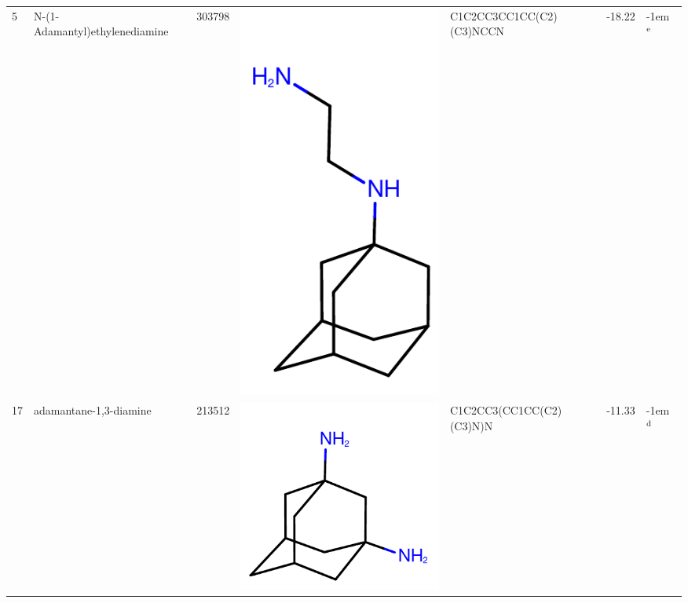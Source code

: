 \documentclass[aps,pre,twocolumn,nofootinbib,superscriptaddress,10pt, final,tightenlines]{revtex4-1}
\begin{document}
\begin{table}
\begin{tabular}{lllp{1.5cm}>{\ttfamily}lS[table-format=-1.2, table-figures-uncertainty=1]l}
5  & N-(1-Adamantyl)ethylenediamine     & 303798    & \parbox[c]{1em}{\includegraphics[scale=0.2]{figures/303798.pdf}}    & C1C2CC3CC1CC(C2)(C3)NCCN                     & -18.22  & \kern-1em {$^{\rm e}$}  \\
17 & adamantane-1,3-diamine             & 213512    & \parbox[c]{1em}{\includegraphics[scale=0.2]{figures/213512.pdf}}    & C1C2CC3(CC1CC(C2)(C3)N)N                     & -11.33  & \kern-1em {$^{\rm d}$}  \\

\end{tabular}
\end{table}
\end{document}
